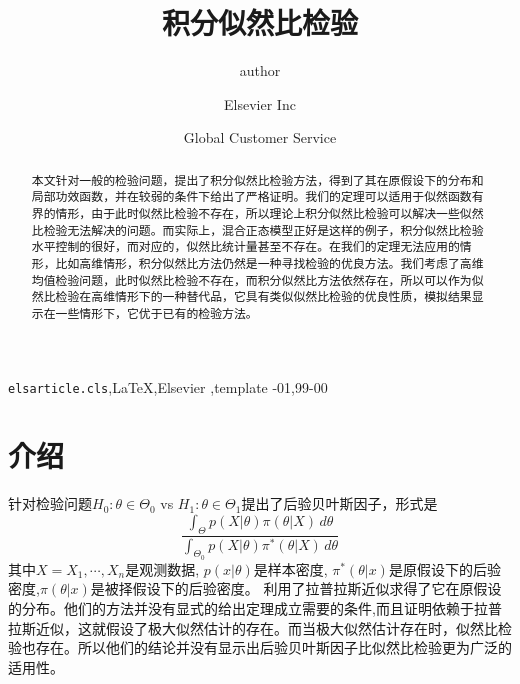 \documentclass[review]{elsarticle}
\begin{document}
\begin{frontmatter}

\title{积分似然比检验}

\author{author }
\address{Radarweg 29, Amsterdam}

\author[mymainaddress,mysecondaryaddress]{Elsevier Inc}

\author[mysecondaryaddress]{Global Customer Service}

\address[mymainaddress]{1600 John F Kennedy Boulevard, Philadelphia}
\address[mysecondaryaddress]{360 Park Avenue South, New York}

\begin{abstract}
    本文针对一般的检验问题，提出了积分似然比检验方法，得到了其在原假设下的分布和局部功效函数，并在较弱的条件下给出了严格证明。我们的定理可以适用于似然函数有界的情形，由于此时似然比检验不存在，所以理论上积分似然比检验可以解决一些似然比检验无法解决的问题。而实际上，混合正态模型正好是这样的例子，积分似然比检验水平控制的很好，而对应的，似然比统计量甚至不存在。在我们的定理无法应用的情形，比如高维情形，积分似然比方法仍然是一种寻找检验的优良方法。我们考虑了高维均值检验问题，此时似然比检验不存在，而积分似然比方法依然存在，所以可以作为似然比检验在高维情形下的一种替代品，它具有类似似然比检验的优良性质，模拟结果显示在一些情形下，它优于已有的检验方法。
\end{abstract}

\begin{keyword}
\texttt{elsarticle.cls}\sep \LaTeX\sep Elsevier \sep template
-01\sep  99-00
\end{keyword}

\end{frontmatter}

\linenumbers

\section{介绍}

 \cite{Aitkin1991Posterior}针对检验问题$H_0:\theta\in \Theta_0$ vs $H_1:\theta\in \Theta_1$提出了后验贝叶斯因子，形式是
\begin{equation}
    \frac{\int_{\Theta} p(X|\theta)\pi(\theta|X)\, d\theta}{\int_{\Theta_0}p(X|\theta)\pi^*(\theta|X)\, d\theta}
\end{equation}
其中$X=X_1,\cdots,X_n$是观测数据, $p(x|\theta)$是样本密度, $\pi^*(\theta|x)$是原假设下的后验密度,$\pi(\theta|x)$是被择假设下的后验密度。
\cite{gelfand1993bayesian}利用了拉普拉斯近似求得了它在原假设的分布。他们的方法并没有显式的给出定理成立需要的条件,而且证明依赖于拉普拉斯近似，这就假设了极大似然估计的存在。而当极大似然估计存在时，似然比检验也存在。所以他们的结论并没有显示出后验贝叶斯因子比似然比检验更为广泛的适用性。
\end{document}
